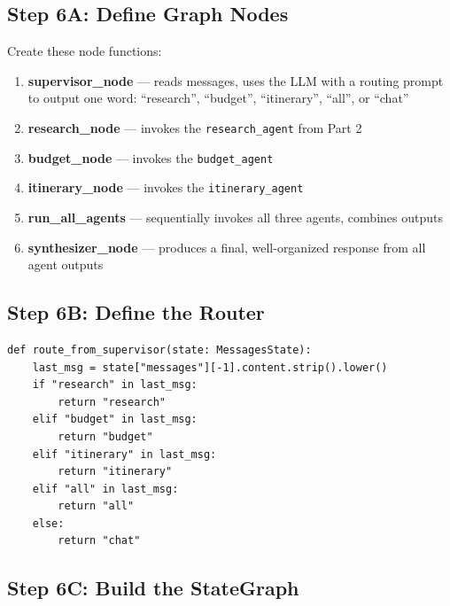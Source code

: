 \documentclass[11pt, letterpaper]{article}
\begin{document}
\subsection*{Step 6A: Define Graph Nodes}

Create these node functions:

\begin{enumerate}[nosep]
  \item \textbf{supervisor\_node} --- reads messages, uses the LLM with a routing prompt to output one word: ``research'', ``budget'', ``itinerary'', ``all'', or ``chat''
  \item \textbf{research\_node} --- invokes the \texttt{research\_agent} from Part 2
  \item \textbf{budget\_node} --- invokes the \texttt{budget\_agent}
  \item \textbf{itinerary\_node} --- invokes the \texttt{itinerary\_agent}
  \item \textbf{run\_all\_agents} --- sequentially invokes all three agents, combines outputs
  \item \textbf{synthesizer\_node} --- produces a final, well-organized response from all agent outputs
\end{enumerate}

\subsection*{Step 6B: Define the Router}

\begin{lstlisting}
def route_from_supervisor(state: MessagesState):
    last_msg = state["messages"][-1].content.strip().lower()
    if "research" in last_msg:
        return "research"
    elif "budget" in last_msg:
        return "budget"
    elif "itinerary" in last_msg:
        return "itinerary"
    elif "all" in last_msg:
        return "all"
    else:
        return "chat"
\end{lstlisting}

\subsection*{Step 6C: Build the StateGraph}
\end{document}
